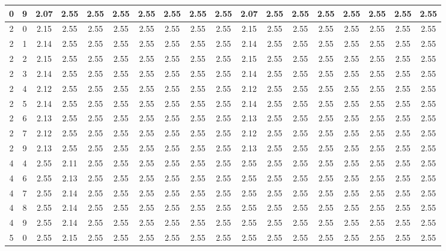 \begin{landscape}
\begin{longtable}{|c|c||c||c|c|c|c|c|c|c||c|c|c|c|c|c|c|c|}
	0 & 9 & 2.07 & 2.55 & 2.55 & 2.55 & 2.55 & 2.55 & 2.55 & 2.55 & 2.07 & 2.55 & 2.55 & 2.55 & 2.55 & 2.55 & 2.55 & 2.55 \\ \hline
	2 & 0 & 2.15 & 2.55 & 2.55 & 2.55 & 2.55 & 2.55 & 2.55 & 2.55 & 2.15 & 2.55 & 2.55 & 2.55 & 2.55 & 2.55 & 2.55 & 2.55 \\ \hline
	2 & 1 & 2.14 & 2.55 & 2.55 & 2.55 & 2.55 & 2.55 & 2.55 & 2.55 & 2.14 & 2.55 & 2.55 & 2.55 & 2.55 & 2.55 & 2.55 & 2.55 \\ \hline
	2 & 2 & 2.15 & 2.55 & 2.55 & 2.55 & 2.55 & 2.55 & 2.55 & 2.55 & 2.15 & 2.55 & 2.55 & 2.55 & 2.55 & 2.55 & 2.55 & 2.55 \\ \hline
	2 & 3 & 2.14 & 2.55 & 2.55 & 2.55 & 2.55 & 2.55 & 2.55 & 2.55 & 2.14 & 2.55 & 2.55 & 2.55 & 2.55 & 2.55 & 2.55 & 2.55 \\ \hline
	2 & 4 & 2.12 & 2.55 & 2.55 & 2.55 & 2.55 & 2.55 & 2.55 & 2.55 & 2.12 & 2.55 & 2.55 & 2.55 & 2.55 & 2.55 & 2.55 & 2.55 \\ \hline
	2 & 5 & 2.14 & 2.55 & 2.55 & 2.55 & 2.55 & 2.55 & 2.55 & 2.55 & 2.14 & 2.55 & 2.55 & 2.55 & 2.55 & 2.55 & 2.55 & 2.55 \\ \hline
	2 & 6 & 2.13 & 2.55 & 2.55 & 2.55 & 2.55 & 2.55 & 2.55 & 2.55 & 2.13 & 2.55 & 2.55 & 2.55 & 2.55 & 2.55 & 2.55 & 2.55 \\ \hline
	2 & 7 & 2.12 & 2.55 & 2.55 & 2.55 & 2.55 & 2.55 & 2.55 & 2.55 & 2.12 & 2.55 & 2.55 & 2.55 & 2.55 & 2.55 & 2.55 & 2.55 \\ \hline
	2 & 9 & 2.13 & 2.55 & 2.55 & 2.55 & 2.55 & 2.55 & 2.55 & 2.55 & 2.13 & 2.55 & 2.55 & 2.55 & 2.55 & 2.55 & 2.55 & 2.55 \\ \hline
	4 & 4 & 2.55 & 2.11 & 2.55 & 2.55 & 2.55 & 2.55 & 2.55 & 2.55 & 2.55 & 2.55 & 2.55 & 2.55 & 2.55 & 2.55 & 2.55 & 2.55 \\ \hline
	4 & 6 & 2.55 & 2.13 & 2.55 & 2.55 & 2.55 & 2.55 & 2.55 & 2.55 & 2.55 & 2.55 & 2.55 & 2.55 & 2.55 & 2.55 & 2.55 & 2.55 \\ \hline
	4 & 7 & 2.55 & 2.14 & 2.55 & 2.55 & 2.55 & 2.55 & 2.55 & 2.55 & 2.55 & 2.55 & 2.55 & 2.55 & 2.55 & 2.55 & 2.55 & 2.55 \\ \hline
	4 & 8 & 2.55 & 2.14 & 2.55 & 2.55 & 2.55 & 2.55 & 2.55 & 2.55 & 2.55 & 2.55 & 2.55 & 2.55 & 2.55 & 2.55 & 2.55 & 2.55 \\ \hline
	4 & 9 & 2.55 & 2.14 & 2.55 & 2.55 & 2.55 & 2.55 & 2.55 & 2.55 & 2.55 & 2.55 & 2.55 & 2.55 & 2.55 & 2.55 & 2.55 & 2.55 \\ \hline
	5 & 0 & 2.55 & 2.15 & 2.55 & 2.55 & 2.55 & 2.55 & 2.55 & 2.55 & 2.55 & 2.55 & 2.55 & 2.55 & 2.55 & 2.55 & 2.55 & 2.55 \\ \hline

\end{longtable}
\end{landscape}

